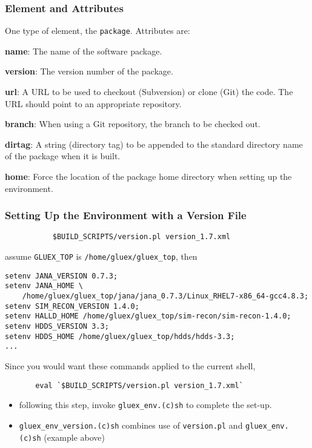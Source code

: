 \documentclass{beamer}
\newcommand{\bi}{\begin{itemize}}
\newcommand{\ei}{\end{itemize}}
\newcommand{\I}{\item}
\begin{document}
\begin{frame}
  \frametitle{Element and Attributes}

One type of element, the {\tt package}. Attributes are:

\begin{description}
\item{\bf name}: The name of the software package.
\item{\bf version}: The version number of the package.
\item{\bf url}: A URL to be used to checkout (Subversion) or clone
  (Git) the code. The URL should point to an appropriate repository.
\item{\bf branch}: When using a Git repository, the branch to be
  checked out.
\item{\bf dirtag}: A string (directory tag) to be appended to the
  standard directory name of the package when it is built.
\item{\bf home}: Force the location of the package home directory when setting up the environment.
\end{description}

\end{frame}
\begin{frame}[fragile]
  \frametitle{Setting Up the Environment with a Version File}
{\small
\begin{verbatim}
           $BUILD_SCRIPTS/version.pl version_1.7.xml
\end{verbatim}
}
assume {\tt GLUEX\_TOP} is {\tt /home/gluex/gluex\_top}, then

{\small
\begin{verbatim}
setenv JANA_VERSION 0.7.3;
setenv JANA_HOME \
    /home/gluex/gluex_top/jana/jana_0.7.3/Linux_RHEL7-x86_64-gcc4.8.3;
setenv SIM_RECON_VERSION 1.4.0;
setenv HALLD_HOME /home/gluex/gluex_top/sim-recon/sim-recon-1.4.0;
setenv HDDS_VERSION 3.3;
setenv HDDS_HOME /home/gluex/gluex_top/hdds/hdds-3.3;
...
\end{verbatim}
}
Since you would want these commands applied to the current shell,
{\small
\begin{verbatim}
       eval `$BUILD_SCRIPTS/version.pl version_1.7.xml`
\end{verbatim}
}
\bi
\I following this step, invoke {\tt gluex\_env.(c)sh} to complete the set-up.
\I {\tt gluex\_env\_version.(c)sh} combines use of {\tt version.pl} and {\tt gluex\_env.(c)sh} (example above)
\ei
\end{frame}
\end{document}

